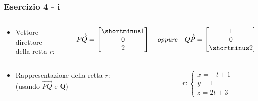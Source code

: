 \documentclass{beamer}
\begin{document}
\begin{frame}
\frametitle{Esercizio 4 - i}
\begin{columns}
\begin{column}{0.48\textwidth}
\begin{itemize}
\item Vettore direttore \\ della retta $r$:
\end{itemize}
\end{column}
\begin{column}{0.58\textwidth}
\begin{displaymath}
\overrightarrow{PQ} =\begin{bmatrix}\shortminus 1 \\ 0 \\ 2 \end{bmatrix}
    \quad
    \mathit{oppure}
    \quad
\overrightarrow{QP} =\begin{bmatrix}1 \\0 \\ \shortminus 2 \end{bmatrix}
\end{displaymath}
\end{column}
\end{columns}
    \vspace{1cm}
\begin{columns}
\begin{column}{0.58\textwidth}
\begin{itemize}
\item Rappresentazione della retta $r$:\\
    (usando $\overrightarrow{PQ}$ e $\mathbf Q$)
\end{itemize}
\end{column}
\begin{column}{0.48\textwidth}
\begin{displaymath}
r :\begin{cases} x = -t +1\\ y = 1 \\z = 2t+3 \end{cases}
\end{displaymath}
\end{column}
\end{columns}

\end{frame}
\end{document}
